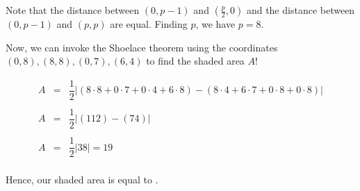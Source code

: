 \documentclass[11pt,paper=letter]{scrartcl}
\begin{document}
\begin{center}
\end{center}

Note that the distance between $(0,p-1)$ and $(\frac{p}{2}, 0)$ and the distance between $(0,p-1)$ and $(p,p)$ are equal. Finding $p$, we have $p=8$. 

Now, we can invoke the Shoelace theorem using the coordinates $(0,8), (8,8), (0,7), (6,4)$ to find the shaded area $A$! 


\begin{equation*}
  \begin{array}{lll}

    A & = & \dfrac{1}{2} 	\big |  (8\cdot8 + 0\cdot7 + 0\cdot4 + 6\cdot8)-(8\cdot4 + 6\cdot7 + 0\cdot8 + 0\cdot8) \big |    \\
    
    \\
    
    A & = & \dfrac{1}{2} 	\big | (112)-(74) 	\big |    \\
    
    \\
    
    A & = & \dfrac{1}{2} 	\big | 38 \big |  = 19   \\
     
  \end{array}
\end{equation*}


Hence, our shaded area is equal to .
\end{document}
